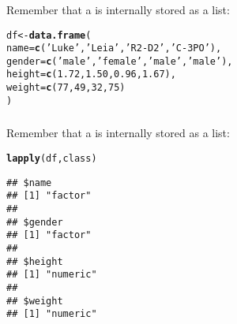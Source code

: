\documentclass[12pt]{beamer}\usepackage[]{graphicx}\usepackage[]{color}
\makeatletter
\newcommand{\hlnum}[1]{\textcolor[rgb]{0.686,0.059,0.569}{#1}}%
\newcommand{\hlstr}[1]{\textcolor[rgb]{0.192,0.494,0.8}{#1}}%
\newcommand{\hlstd}[1]{\textcolor[rgb]{0.345,0.345,0.345}{#1}}%
\newcommand{\hlkwb}[1]{\textcolor[rgb]{0.69,0.353,0.396}{#1}}%
\newcommand{\hlkwc}[1]{\textcolor[rgb]{0.333,0.667,0.333}{#1}}%
\newcommand{\hlkwd}[1]{\textcolor[rgb]{0.737,0.353,0.396}{\textbf{#1}}}%
\newenvironment{kframe}{%
 \def\at@end@of@kframe{}%
 \ifinner\ifhmode%
  \def\at@end@of@kframe{\end{minipage}}%
  \begin{minipage}{\columnwidth}%
 \fi\fi%
 \def\FrameCommand##1{\hskip\@totalleftmargin \hskip-\fboxsep
 \colorbox{shadecolor}{##1}\hskip-\fboxsep
     \hskip-\linewidth \hskip-\@totalleftmargin \hskip\columnwidth}%
 \MakeFramed {\advance\hsize-\width
   \@totalleftmargin\z@ \linewidth\hsize
   \@setminipage}}%
 {\par\unskip\endMakeFramed%
 \at@end@of@kframe}
\newenvironment{knitrout}{}{} %
\makeatother
\begin{document}
\begin{frame}[fragile]
\frametitle{}

Remember that a  is internally stored as a list:
\begin{knitrout}\footnotesize
{}\color{fgcolor}\begin{kframe}
\begin{alltt}
\hlstd{df} \hlkwb{<-} \hlkwd{data.frame}\hlstd{(}
  \hlkwc{name} \hlstd{=} \hlkwd{c}\hlstd{(}\hlstr{'Luke'}\hlstd{,} \hlstr{'Leia'}\hlstd{,} \hlstr{'R2-D2'}\hlstd{,} \hlstr{'C-3PO'}\hlstd{),}
  \hlkwc{gender} \hlstd{=} \hlkwd{c}\hlstd{(}\hlstr{'male'}\hlstd{,} \hlstr{'female'}\hlstd{,} \hlstr{'male'}\hlstd{,} \hlstr{'male'}\hlstd{),}
  \hlkwc{height} \hlstd{=} \hlkwd{c}\hlstd{(}\hlnum{1.72}\hlstd{,} \hlnum{1.50}\hlstd{,} \hlnum{0.96}\hlstd{,} \hlnum{1.67}\hlstd{),}
  \hlkwc{weight} \hlstd{=} \hlkwd{c}\hlstd{(}\hlnum{77}\hlstd{,} \hlnum{49}\hlstd{,} \hlnum{32}\hlstd{,} \hlnum{75}\hlstd{)}
\hlstd{)}
\end{alltt}
\end{kframe}
\end{knitrout}

\end{frame}


\begin{frame}[fragile]
\frametitle{}

Remember that a  is internally stored as a list:
\begin{knitrout}\footnotesize
{}\color{fgcolor}\begin{kframe}
\begin{alltt}
\hlkwd{lapply}\hlstd{(df, class)}
\end{alltt}
\begin{verbatim}
## $name
## [1] "factor"
## 
## $gender
## [1] "factor"
## 
## $height
## [1] "numeric"
## 
## $weight
## [1] "numeric"
\end{verbatim}
\end{kframe}
\end{knitrout}

\end{frame}


\begin{frame}
\begin{center}
\Huge{}
\end{center}
\end{frame}
\end{document}
